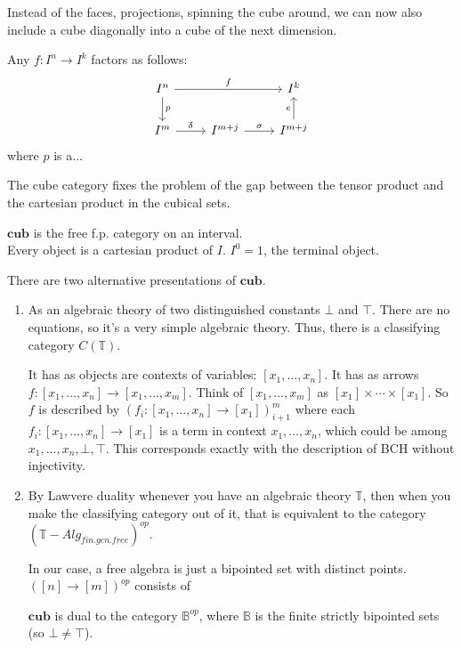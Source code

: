 \documentclass{article}
\newcommand{\ccub}{\mathbf{cub}}
\begin{document}
Instead of the faces, projections, spinning the cube around, we can now also
include a cube diagonally into a cube of the next dimension.

\begin{lem}
Any $f:I^n\to I^k$ factors as follows:
\begin{equation*}
\begin{tikzcd}
I^n \arrow[rr,"f"] \ar[d,"p"] & & I^k\\
I^m \arrow[r,"\delta"] & I^{m+j} \arrow[r,"\sigma"] & I^{m+j} \arrow[u,"e"]
\end{tikzcd}
\end{equation*}
where $p$ is a...
\end{lem}

The cube category fixes the problem of the gap between the tensor product and
the cartesian product in the cubical sets.

\begin{lem}
$\ccub$ is the free f.p. category on an interval.
\begin{equation*}
\end{equation*}
Every object is a cartesian product of $I$. $I^0=1$, the terminal object.
\end{lem}

There are two alternative presentations of $\ccub$. 

\begin{enumerate}
\item As an algebraic theory of two distinguished constants $\bot$ and $\top$. There
are no equations, so it's a very simple algebraic theory. Thus, there is a
classifying category $C(\mathbb{T})$. 

It has as objects are contexts of variables: $[x_1,\ldots,x_n]$.
It has as arrows $f:[x_1,\ldots,x_n]\to[x_1,\ldots,x_m]$. Think of
$[x_1,\ldots,x_m]$ as $[x_1]\times\cdots\times[x_1]$. So $f$ is described by
$(f_i:[x_1,\ldots,x_n]\to[x_1])^m_{i+1}$ where each $f_i:[x_1,\ldots,x_n]\to[x_1]$
is a term in context $x_1,\ldots,x_n$, which could be among $x_1,\ldots,x_n,\bot,\top$.
This corresponds exactly with the description of BCH without injectivity.
\item By Lawvere duality whenever you have an algebraic theory $\mathbb{T}$, then
when you make the classifying category out of it, that is equivalent to the
category $(\mathbb{T}-Alg_{fin.gen.free})^{op}$.

In our case, a free algebra is just a bipointed set with distinct points.
$([n]\to [m])^{op}$ consists of 

\begin{lem}
$\ccub$ is dual to the category $\mathbb{B}^{op}$, where $\mathbb{B}$ is the
finite strictly bipointed sets (so $\bot\neq\top$).
\end{lem}
\end{enumerate}
\end{document}
